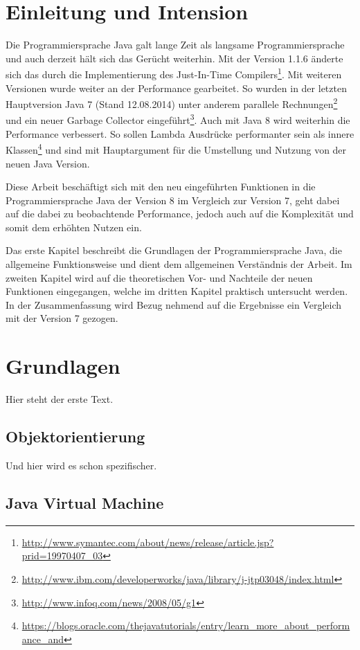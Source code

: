 
\chapter{Einleitung und Intension}
\label{sec:EinleitungUndIntension}
Die Programmiersprache Java galt lange Zeit als langsame Programmiersprache und
auch derzeit hält sich das Gerücht weiterhin.
Mit der Version 1.1.6 änderte sich das durch die Implementierung des
Just-In-Time
Compilers\footnote{\url{http://www.symantec.com/about/news/release/article.jsp?prid=19970407_03}}.
Mit weiteren Versionen wurde weiter an der Performance gearbeitet. So wurden in der letzten Hauptversion Java 7 (Stand 12.08.2014) unter anderem parallele Rechnungen\footnote{\url{http://www.ibm.com/developerworks/java/library/j-jtp03048/index.html}}
 und ein neuer Garbage Collector eingeführt\footnote{\url{http://www.infoq.com/news/2008/05/g1}}.
 Auch mit Java 8 wird weiterhin die Performance verbessert. So sollen Lambda
 Ausdrücke performanter sein als innere Klassen\footnote{\url{https://blogs.oracle.com/thejavatutorials/entry/learn_more_about_performance_and}} und sind mit Hauptargument für die Umstellung und Nutzung von der neuen Java
 Version.
 
 Diese Arbeit beschäftigt sich mit den neu eingeführten Funktionen in die
 Programmiersprache Java der Version 8 im Vergleich zur Version 7, geht dabei
 auf die dabei zu beobachtende Performance, jedoch auch auf die Komplexität und
 somit dem erhöhten Nutzen ein.
 
 Das erste Kapitel beschreibt die Grundlagen der Programmiersprache
 Java, die allgemeine Funktionsweise und dient dem allgemeinen Verständnis der
 Arbeit.
 Im zweiten Kapitel wird auf die theoretischen Vor- und Nachteile der neuen
 Funktionen eingegangen, welche im dritten Kapitel praktisch untersucht werden.
 In der Zusammenfassung wird Bezug nehmend auf die Ergebnisse ein Vergleich mit
 der Version 7 gezogen.
 
\chapter{Grundlagen}
\label{sec:Grundlagen}
Hier steht der erste Text.

\section{Objektorientierung}
\label{sec:OO}
Und hier wird es schon spezifischer.

\section{Java Virtual Machine}
\label{sec:JVM}

